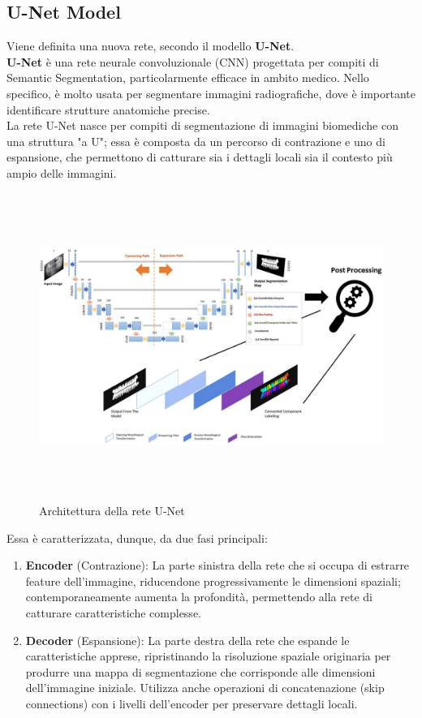\documentclass[12pt,a4paper,openright,twoside]{book}
\begin{document}
\subsection{U-Net Model}
Viene definita una nuova rete, secondo il modello \textbf{U-Net}.\\
\textbf{U-Net} è una rete neurale convoluzionale (CNN) progettata per compiti di Semantic Segmentation, particolarmente efficace in ambito medico. Nello specifico, è molto usata per segmentare immagini radiografiche, dove è importante identificare strutture anatomiche precise. \\
La rete U-Net nasce per compiti di segmentazione di immagini biomediche con una struttura "a U"; essa è composta da un percorso di contrazione e uno di espansione, che permettono di catturare sia i dettagli locali sia il contesto più ampio delle immagini.
\begin{figure}[H]
	\hspace{-2cm}
	\includegraphics[height=10cm,width=18cm]{figures/ArchitectureUnet.pdf}
    	\caption{Architettura della rete U-Net}
	\label{fig:unet}
\end{figure}
Essa è caratterizzata, dunque, da due fasi principali:
\begin{enumerate}
\item \textbf{Encoder} (Contrazione): La parte sinistra della rete che si occupa di estrarre feature dell’immagine, riducendone progressivamente le dimensioni spaziali; contemporaneamente aumenta la profondità, permettendo alla rete di catturare caratteristiche complesse.
\item \textbf{Decoder} (Espansione): La parte destra della rete che espande le caratteristiche apprese, ripristinando la risoluzione spaziale originaria per produrre una mappa di segmentazione che corrisponde alle dimensioni dell’immagine iniziale. Utilizza anche operazioni di concatenazione (skip connections) con i livelli dell'encoder per preservare dettagli locali.
\end{enumerate}
\end{document}
